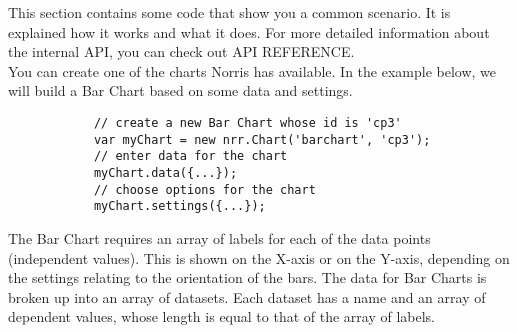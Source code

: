 		This section contains some code that show you a common scenario. It is explained how it works and what it does. For more detailed information about the internal API, you can check out API REFERENCE.\\
		You can create one of the charts Norris has available. In the example below, we will build a Bar Chart based on some data and settings.
		\begin{lstlisting}
			// create a new Bar Chart whose id is 'cp3'
			var myChart = new nrr.Chart('barchart', 'cp3');
			// enter data for the chart
			myChart.data({...});
			// choose options for the chart
			myChart.settings({...});
		\end{lstlisting}
			The Bar Chart requires an array of labels for each of the data points (independent values). This is shown on the X-axis or on the Y-axis, depending on the settings relating to the orientation of the bars. The data for Bar Charts is broken up into an array of datasets. Each dataset has a name and an array of dependent values, whose length is equal to that of the array of labels.